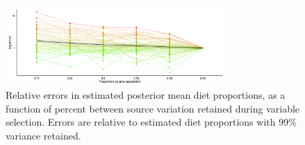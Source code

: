 \documentclass[12pt]{article}
\begin{document}
\quad
\begin{figure}[!htbp]
  \begin{center}    
      \includegraphics[width=0.75\textwidth]{Simulations/figures/test_var_select.pdf}  
       \caption{Relative errors in estimated posterior mean diet
         proportions, as a function of percent between source
         variation retained during variable selection. Errors are
         relative to estimated diet proportions with 99\% variance retained.}
\label{fig:test_var_select}
\end{center}
\end{figure}
\quad

\printbibliography
\end{document}
